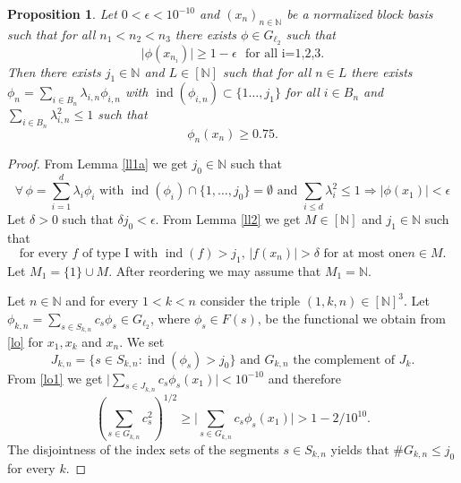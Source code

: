 \documentclass[a4paper]{amsart}
\theoremstyle{plain}
\newtheorem{proposition}[theorem]{Proposition}
\newcommand{\N}{\mathbb{N}}
\newcommand{\e}{\epsilon}
\newcommand{\xn}[1][x]{(#1_{n})_{n\in\N}}
\DeclareMathOperator{\ind}{ind}
\DeclareMathOperator{\inde}{ind}
\begin{document}
\begin{proposition}\label{nol1}
Let $0<\e<10^{-10}$ and  $\xn$ be a normalized block basis such that for all $n_{1}<n_{2}<n_{3}$  there exists $\phi\in G_{\ell_2}$  such that
\begin{equation}\label{lo}
 \vert \phi(x_{n_i})\vert\geq 1-\e\,\,\,\,\text{for all i=1,2,3}.
\end{equation}
Then there exists  $j_{1}\in\N$ and  $L\in [\N]$ such that for all $n\in L$ there exists
$\phi_{n}=\sum_{i\in B_{n}}\lambda_{i,n}\phi_{i,n}$ with $\inde(\phi_{i,n})\subset\{1\dots,j_1\}$
for all $i\in B_{n}$ and $\sum_{i\in B_{n}}\lambda_{i,n}^{2}\leq 1$ such that
$$
\phi_{n}(x_{n})\geq 0.75.
$$
\end{proposition}
\begin{proof}
From Lemma \ref{ll1a} we get     $j_0\in\N$ such that
\begin{equation}\label{lo1}
\mbox{$\forall\,\phi=\sum_{i=1}^{d}\lambda_{i}\phi_{i}$ with $\inde(\phi_{i})\cap\{1,\dots,j_0\}=\emptyset$ and $\sum_{i\leq d}\lambda_{i}^{2}\leq 1$}
\Rightarrow
\vert\phi(x_1)\vert<\e
\end{equation}
Let $\delta>0$ such that $\delta j_0<\e$. From Lemma \ref{ll2} we get $M\in [\N]$  and $j_{1}\in \N$ such that
\begin{equation}\label{lo2}\mbox{
for every $f$ of type I with $\ind(f)>j_1$, $\vert f(x_n)\vert>\delta$ for at most one
$n\in M$.}
\end{equation}
Let $M_{1}=\{1\}\cup M$. After reordering we may assume that $M_{1}=\N$.

Let $n\in \N$ and for every $1<k<n$ consider the triple $(1,k,n)\in [\N]^{3}$. Let
$\phi_{k,n}=\sum_{s\in S_{k,n}}c_{s}\phi_{s}\in G_{\ell_2}$, where $\phi_{s}\in F(s)$, be
the functional we obtain  from \eqref{lo} for $x_{1}, x_{k}$ and $x_{n}$. We set
$$
\mbox{$J_{k,n}=\{s\in S_{k,n}: \inde(\phi_{s})>j_{0}\}$ and $G_{k,n}$ the complement of $J_{k}$.}
$$
From \eqref{lo1} we get $\vert\sum_{s\in J_{k,n}}c_{s}\phi_{s}(x_{1})\vert<10^{-10}$ and
therefore
\begin{equation}\label{lo3}
(\sum_{s\in G_{k,n}}c_{s}^{2})^{1/2}\geq\vert \sum_{s\in G_{k,n}}c_{s}\phi_{s}(x_{1})\vert>1-2/10^{10}.
\end{equation}
The disjointness of the index sets of the segments $s\in S_{k,n}$ yields that  $\# G_{k,n}\leq j_0$ for every $k$.


\end{proof}
\end{document}
